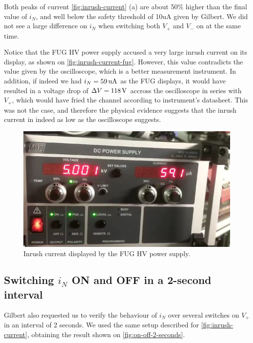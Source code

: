 \documentclass[oneside,12pt]{article}
\begin{document}
Both peaks of current \autoref{fig:inrush-current} (a) are about 50\% higher than the final value of $i_N$, and well below the 
safety threshold of 10uA given by Gilbert. We did not see a large difference on $i_N$ when switching both $V_+$ and $V_-$ on at the 
same time. 

Notice that the FUG HV power supply accused a very large inrush current on its display, as shown on \autoref{fig:inrush-current-fug}.
However, this value contradicts the value given by the oscilloscope, which is a better measurement instrument. In addition, if
indeed we had $i_N = 59 \,\mathrm{uA}$ as the FUG displays, it would have resulted in a voltage drop of $\Delta V = 118 \,\mathrm{V}$ accross the 
oscilloscope in series with $V_+$, which would have fried the channel according to instrument's datasheet. This was not the case, 
and therefore the physical evidence suggests that the inrush current in indeed as low as the oscilloscope suggests. 

\begin{figure}[h!]
    \centering
    \includegraphics[width=\textwidth,trim=1 1 1 1,clip]{figures/inrush-current-fug.png}
    \caption{Inrush current displayed by the FUG HV power supply.}
    \label{fig:inrush-current-fug}
\end{figure}

\subsection{Switching $i_N$ ON and OFF in a 2-second interval}

Gilbert also requested us to verify the behaviour of $i_N$ over several switches on $V_+$ in an interval of 2 seconds. We used the same 
setup described for \autoref{fig:inrush-current}, obtaining the result shown on \autoref{fig:on-off-2-seconds}.
\end{document}
